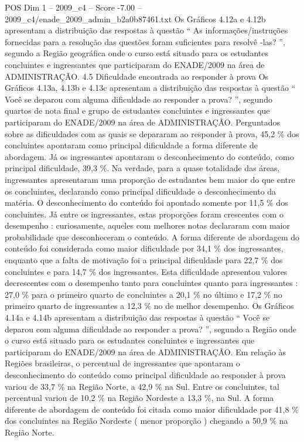 \begin{textsample}{POS Dim 1 – 2009\_c4 – Score -7.00 – 2009\_c4/enade\_2009\_admin\_b2a0b87461.txt}
Os Gráficos 4.12a e 4.12b apresentam a distribuição das respostas à questão “ As informações/instruções fornecidas para a resolução das questões foram suficientes para resolvê -las? ”, segundo a Região geográfica onde o curso está situado para os estudantes concluintes e ingressantes que participaram do ENADE/2009 na área de ADMINISTRAÇÃO. 4.5 Dificuldade encontrada ao responder à prova Os Gráficos 4.13a, 4.13b e 4.13c apresentam a distribuição das respostas à questão “ Você se deparou com alguma dificuldade ao responder a prova? ”, segundo quartos de nota final e grupo de estudantes concluintes e ingressantes que participaram do ENADE/2009 na área de ADMINISTRAÇÃO.
Perguntados sobre as dificuldades com as quais se depararam ao responder à prova, 45,2 \% dos concluintes apontaram como principal dificuldade a forma diferente de abordagem.
Já os ingressantes apontaram o desconhecimento do conteúdo, como principal dificuldade, 39,3 \%.
Na verdade, para a quase totalidade das áreas, ingressantes apresentaram uma proporção de estudantes bem maior do que entre os concluintes, declarando como principal dificuldade o desconhecimento da matéria.
O desconhecimento do conteúdo foi apontado somente por 11,5 \% dos concluintes.
Já entre os ingressantes, estas proporções foram crescentes com o desempenho : curiosamente, aqueles com melhores notas declararam com maior probabilidade que desconheceram o conteúdo.
A forma diferente de abordagem do conteúdo foi considerada como maior dificuldade por 34,1 \% dos ingressantes, enquanto que a falta de motivação foi a principal dificuldade para 22,7 \% dos concluintes e para 14,7 \% dos ingressantes.
Esta dificuldade apresentou valores decrescentes com o desempenho tanto para concluintes quanto para ingressantes : 27,0 \% para o primeiro quarto de concluintes a 20,1 \% no último e 17,2 \% no primeiro quarto de ingressantes a 12,3 \% no de melhor desempenho.
Os Gráficos 4.14a e 4.14b apresentam a distribuição das respostas à questão “ Você se deparou com alguma dificuldade ao responder a prova? ”, segundo a Região onde o curso está situado para os estudantes concluintes e ingressantes que participaram do ENADE/2009 na área de ADMINISTRAÇÃO.
Em relação às Regiões brasileiras, o percentual de ingressantes que apontaram o desconhecimento do conteúdo como principal dificuldade ao responder à prova variou de 33,7 \% na Região Norte, a 42,9 \% na Sul.
Entre os concluintes, tal percentual variou de 10,2 \% na Região Nordeste a 13,3 \%, na Sul.
A forma diferente de abordagem de conteúdo foi citada como maior dificuldade por 41,8 \% dos concluintes na Região Nordeste ( menor proporção ) chegando a 50,9 \% na Região Norte.

\end{textsample}
